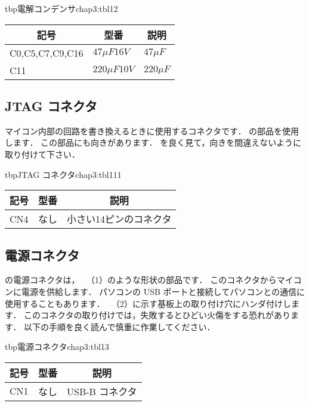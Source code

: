 \begin{mytable}{tbp}{電解コンデンサ}{chap3:tbl12}
  {\small\begin{tabular}{l|l|l}
    \hline
    \hline
    \multicolumn{1}{c|}{記号} &
    \multicolumn{1}{c|}{型番} &
    \multicolumn{1}{c}{説明} \\
    \hline
    C0,C5,C7,C9,C16 & $ 47  \mu F 16V $ & $ 47  \mu F$ \\
    C11             & $ 220 \mu F 10V $ & $ 220 \mu F$ \\
  \end{tabular}}
\end{mytable}


\subsection{JTAG コネクタ}
マイコン内部の回路を書き換えるときに使用するコネクタです．
の部品を使用します．
この部品にも向きがあります．
を良く見て，向きを間違えないように取り付けて下さい．

\begin{mytable}{tbp}{JTAG コネクタ}{chap3:tbl111}
  {\small\begin{tabular}{l|l|l}
    \hline
    \hline
    \multicolumn{1}{c|}{記号} &
    \multicolumn{1}{c|}{型番} &
    \multicolumn{1}{c}{説明} \\
    \hline
    CN4 & なし & 小さい14ピンのコネクタ \\
  \end{tabular}}
\end{mytable}


\subsection{電源コネクタ}

の電源コネクタは，
~（1）のような形状の部品です．
このコネクタからマイコンに電源を供給します．
パソコンの USB ポートと接続してパソコンとの通信に使用することもあります．
~（2）に示す基板上の取り付け穴にハンダ付けします．
このコネクタの取り付けでは，失敗するとひどい火傷をする恐れがあります．
以下の手順を良く読んで慎重に作業してください．

\begin{mytable}{tbp}{電源コネクタ}{chap3:tbl13}
  {\small\begin{tabular}{l|l|l}
    \hline
    \hline
    \multicolumn{1}{c|}{記号} &
    \multicolumn{1}{c|}{型番} &
    \multicolumn{1}{c}{説明} \\
    \hline
    CN1 & なし & USB-B コネクタ \\
  \end{tabular}}
\end{mytable}

